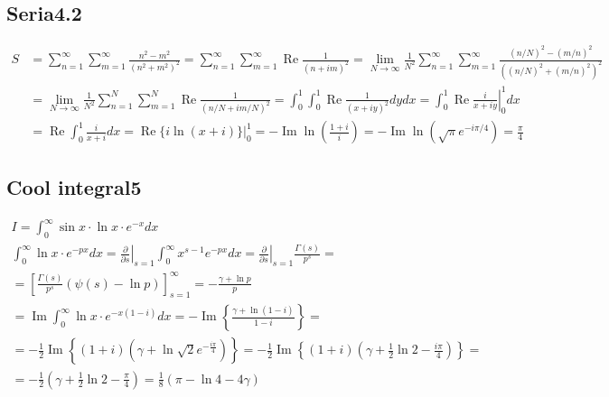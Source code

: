 	\subsection{Seria4.2}
	
	$$
	\begin{aligned}
		S & =\sum_{n=1}^{\infty} \sum_{m=1}^{\infty} \frac{n^2-m^2}{\left(n^2+m^2\right)^2}=\sum_{n=1}^{\infty} \sum_{m=1}^{\infty} \operatorname{Re} \frac{1}{(n+i m)^2}=\lim _{N \rightarrow \infty} \frac{1}{N^2} \sum_{n=1}^{\infty} \sum_{m=1}^{\infty} \frac{(n/N)^2-(m/n)^2}{\left((n/N)^2+(m/n)^2\right)^2} \\
		& = \lim _{N \rightarrow \infty} \frac{1}{N^2} \sum_{n=1}^N \sum_{m=1}^N \operatorname{Re} \frac{1}{(n / N+i m / N)^2}=\int_0^1 \int_0^1 \operatorname{Re} \frac{1}{(x+i y)^2} d y d x=\left.\int_0^1 \operatorname{Re} \frac{i}{x+i y}\right|_0 ^1 d x \\
		& =\operatorname{Re} \int_0^1 \frac{i}{x+i} d x=\left.\operatorname{Re}\{i \ln (x+i)\}\right|_0 ^1=-\operatorname{Im} \ln \left(\frac{1+i}{i}\right)=-\operatorname{Im} \ln \left(\sqrt{\pi} e^{-i \pi / 4}\right)=\frac{\pi}{4}
	\end{aligned}
	$$
	
	\subsection{Cool integral5}
	
	$$
	\begin{gathered}
		I=\int_0^{\infty} \sin x \cdot \ln x \cdot e^{-x} d x \\
		\int_0^{\infty} \ln x \cdot e^{-p x} d x=\left.\frac{\partial}{\partial s}\right|_{s=1} \int_0^{\infty} x^{s-1} e^{-p x} d x=\left.\frac{\partial}{\partial s}\right|_{s=1} \frac{\Gamma(s)}{p^s}= \\
		=\left[\frac{\Gamma(s)}{p^s}(\psi(s)-\ln p)\right]_{s=1}^{\infty}=-\frac{\gamma+\ln p}{p} \\
		=\operatorname{Im} \int_0^{\infty} \ln x \cdot e^{-x(1-i)} d x=-\operatorname{Im}\left\{\frac{\gamma+\ln (1-i)}{1-i}\right\}= \\
		=-\frac{1}{2} \operatorname{Im}\left\{(1+i)\left(\gamma+\ln \sqrt{2} e^{-\frac{i \pi}{4}}\right)\right\}=-\frac{1}{2} \operatorname{Im}\left\{(1+i)\left(\gamma+\frac{1}{2} \ln 2-\frac{i \pi}{4}\right)\right\}= \\
		=-\frac{1}{2}\left(\gamma+\frac{1}{2} \ln 2-\frac{\pi}{4}\right)=\frac{1}{8}(\pi-\ln 4-4 \gamma)		
	\end{gathered}
	$$
	
	
	
